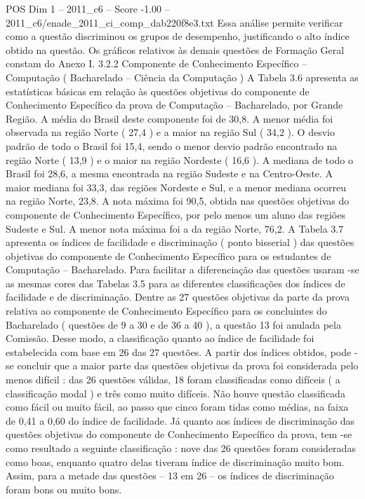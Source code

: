 \begin{textsample}{POS Dim 1 – 2011\_c6 – Score -1.00 – 2011\_c6/enade\_2011\_ci\_comp\_dab220f8e3.txt}
Essa análise permite verificar como a questão discriminou os grupos de desempenho, justificando o alto índice obtido na questão.
Os gráficos relativos às demais questões de Formação Geral constam do Anexo I. 3.2.2 Componente de Conhecimento Específico – Computação ( Bacharelado – Ciência da Computação ) A Tabela 3.6 apresenta as estatísticas básicas em relação às questões objetivas do componente de Conhecimento Específico da prova de Computação – Bacharelado, por Grande Região.
A média do Brasil deste componente foi de 30,8.
A menor média foi observada na região Norte ( 27,4 ) e a maior na região Sul ( 34,2 ).
O desvio padrão de todo o Brasil foi 15,4, sendo o menor desvio padrão encontrado na região Norte ( 13,9 ) e o maior na região Nordeste ( 16,6 ).
A mediana de todo o Brasil foi 28,6, a mesma encontrada na região Sudeste e na Centro-Oeste.
A maior mediana foi 33,3, das regiões Nordeste e Sul, e a menor mediana ocorreu na região Norte, 23,8.
A nota máxima foi 90,5, obtida nas questões objetivas do componente de Conhecimento Específico, por pelo menos um aluno das regiões Sudeste e Sul.
A menor nota máxima foi a da região Norte, 76,2.
A Tabela 3.7 apresenta os índices de facilidade e discriminação ( ponto bisserial ) das questões objetivas do componente de Conhecimento Específico para os estudantes de Computação – Bacharelado.
Para facilitar a diferenciação das questões usaram -se as mesmas cores das Tabelas 3.5 para as diferentes classificações dos índices de facilidade e de discriminação.
Dentre as 27 questões objetivas da parte da prova relativa ao componente de Conhecimento Específico para os concluintes do Bacharelado ( questões de 9 a 30 e de 36 a 40 ), a questão 13 foi anulada pela Comissão.
Desse modo, a classificação quanto ao índice de facilidade foi estabelecida com base em 26 das 27 questões.
A partir dos índices obtidos, pode -se concluir que a maior parte das questões objetivas da prova foi considerada pelo menos difícil : das 26 questões válidas, 18 foram classificadas como difíceis ( a classificação modal ) e três como muito difíceis.
Não houve questão classificada como fácil ou muito fácil, ao passo que cinco foram tidas como médias, na faixa de 0,41 a 0,60 do índice de facilidade.
Já quanto aos índices de discriminação das questões objetivas do componente de Conhecimento Específico da prova, tem -se como resultado a seguinte classificação : nove das 26 questões foram consideradas como boas, enquanto quatro delas tiveram índice de discriminação muito bom.
Assim, para a metade das questões – 13 em 26 – os índices de discriminação foram bons ou muito bons.

\end{textsample}
